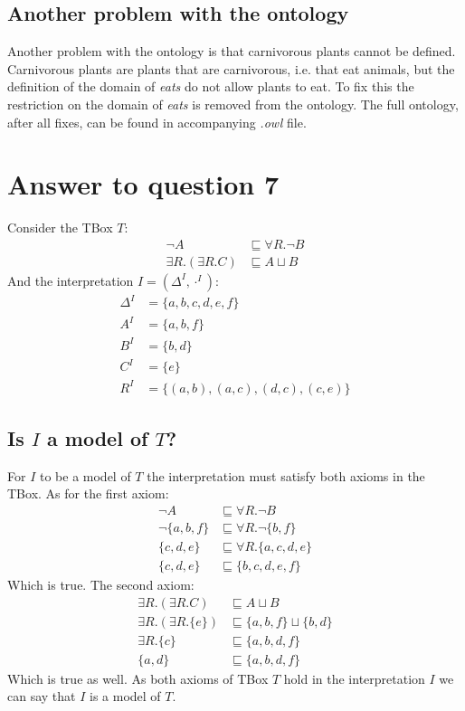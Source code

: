\documentclass[a4paper,12pt]{article}
\begin{document}
\subsection[Fixed ontology]{Another problem with the ontology}
\label{fixdomain}
Another problem with the ontology is that carnivorous plants cannot be defined.
Carnivorous plants are plants that are carnivorous, i.e. that eat animals, but
the definition of the domain of \emph{eats} do not allow plants to eat.  To fix
this the restriction on the domain of \emph{eats} is removed from the ontology.
The full ontology, after all fixes, can be found in accompanying \emph{.owl}
file.

\section[Question 7]{Answer to question 7}

Consider the TBox $T$:
\begin{align*}
                 \neg A &\sqsubseteq \forall R.\neg B\\
\exists R.(\exists R.C) &\sqsubseteq A \sqcup B
\end{align*}
And the interpretation $ I = (\Delta^I, \cdot^I) $:
\begin{align*}
\Delta^I &= \{a,b,c,d,e,f\}\\
     A^I &= \{a,b,f\}\\
     B^I &= \{b,d\}\\
     C^I &= \{e\}\\
     R^I &= \{(a,b),(a,c),(d,c),(c,e)\}
\end{align*}

\subsection[Model]{Is $I$ a model of $T$?}
\label{itproof}
For $I$ to be a model of $T$ the interpretation must satisfy both axioms in the
TBox.  As for the first axiom:
\begin{align*}
        \neg A &\sqsubseteq \forall R.\neg B\\
\neg \{a,b,f\} &\sqsubseteq \forall R.\neg \{b,f\}\\
     \{c,d,e\} &\sqsubseteq \forall R.\{a,c,d,e\}\\
     \{c,d,e\} &\sqsubseteq \{b,c,d,e,f\}
\end{align*}
Which is true.  The second axiom:
\begin{align*}
    \exists R.(\exists R.C) &\sqsubseteq A \sqcup B\\
\exists R.(\exists R.\{e\}) &\sqsubseteq \{a,b,f\} \sqcup \{b,d\}\\
            \exists R.\{c\} &\sqsubseteq \{a,b,d,f\}\\
                    \{a,d\} &\sqsubseteq \{a,b,d,f\}
\end{align*}
Which is true as well.  As both axioms of TBox $T$ hold in the interpretation
$I$ we can say that $I$ is a model of $T$.
\end{document}
